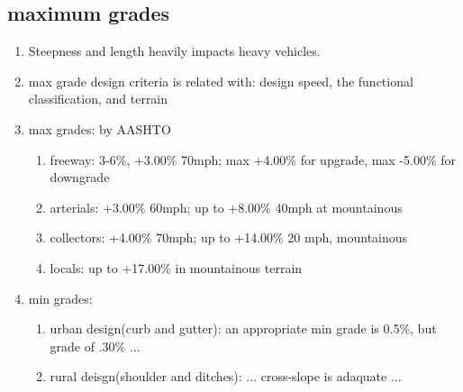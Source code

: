 \documentclass{article}
\begin{document}
  \subsection{maximum grades}
  \begin{enumerate}
    \item Steepness and length heavily impacts heavy vehicles.
    \item max grade design criteria is related with: design speed, the functional classification, and terrain
    \item max grades: by AASHTO
    \begin{enumerate}
      \item freeway: 3-6\%, +3.00\% 70mph; max +4.00\% for upgrade, max -5.00\% for downgrade 
      \item arterials: +3.00\% 60mph; up to +8.00\% 40mph at mountainous 
      \item collectors: +4.00\% 70mph; up to +14.00\% 20 mph, mountainous
      \item locals: up to +17.00\% in mountainous terrain
    \end{enumerate}
    \item min grades:
    \begin{enumerate}
      \item urban design(curb and gutter): an appropriate min grade is 0.5\%, but grade of .30\% ...
      \item rural deisgn(shoulder and ditches): ... cross-slope is adaquate ...
    \end{enumerate}
  \end{enumerate}
\end{document}
